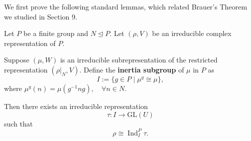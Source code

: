 We first prove the following standard lemmas, which related Brauer's Theorem we studied in Section 9.

\begin{thm}[Clifford]\label{Clifford}
Let \(P\) be a finite group and \(N \trianglelefteq P\). Let $(\rho,V)$ be an irreducible complex representation of \(P\). 

Suppose \((\mu, W) \) is an irreducible subrepresentation of the restricted representation $(\rho|_N,V)$. Define the \textbf{inertia subgroup} of $\mu$ in $P$ as
\[
I := \{ g \in P \mid \mu^g \cong \mu \},
\]
where $\mu^g(n)=\mu(g^{-1}ng),\quad\forall n\in N$.

Then there exists an irreducible representation 
\[
\tau: I \to \mathrm{GL}(U)
\]
such that 
\[
\rho \cong \operatorname{Ind}_{I}^{P} \tau.
\]
\end{thm}

